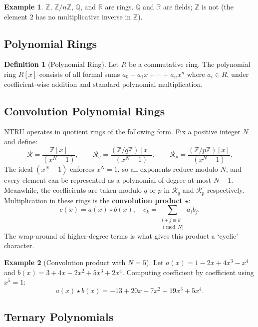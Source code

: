 \documentclass[12pt, a4paper]{article}
\theoremstyle{definition}
\newtheorem{definition}{Definition}[section]
\newtheorem{example}{Example}[section]
\theoremstyle{plain}
\newcommand{\Z}{\mathbb{Z}}
\newcommand{\R}{\mathcal{R}}
\begin{document}
\begin{example}
    $\Z$, $\Z/n\Z$, $\mathbb{Q}$, and $\mathbb{R}$ are rings. $\mathbb{Q}$ and $\mathbb{R}$ are fields; $\Z$ is not (the element $2$ has no multiplicative inverse in $\Z$).
\end{example}

\subsection{Polynomial Rings}

\begin{definition}[Polynomial Ring]
    Let $R$ be a commutative ring. The polynomial ring $R[x]$ consists of all formal sums $a_0 + a_1 x + \cdots + a_n x^n$ where $a_i \in R$, under coefficient-wise addition and standard polynomial multiplication.
\end{definition}

\subsection{Convolution Polynomial Rings}

NTRU operates in quotient rings of the following form. Fix a positive integer $N$ and define:
\[
    \R = \frac{\Z[x]}{(x^N - 1)}, \qquad
    \R_q = \frac{(\Z/q\Z)[x]}{(x^N - 1)}, \qquad
    \R_p = \frac{(\Z/p\Z)[x]}{(x^N - 1)}.
\]
The ideal $(x^N - 1)$ enforces $x^N = 1$, so all exponents reduce modulo $N$, and every element can be represented as a polynomial of degree at most $N-1$. Meanwhile, the coefficients are taken modulo $q$ or $p$ in $\R_q$ and $\R_p$ respectively.\\

Multiplication in these rings is the \textbf{convolution product} $\star$:
\[
    c(x) = a(x) \star b(x), \quad c_k = \sum_{\substack{i+j \equiv k \\ \pmod{N}}} a_i b_j.
\]
The wrap-around of higher-degree terms is what gives this product a `cyclic' character.

\begin{example}[Convolution product with $N = 5$]
    Let $a(x) = 1 - 2x + 4x^3 - x^4$ and $b(x) = 3 + 4x - 2x^2 + 5x^3 + 2x^4$.
    Computing coefficient by coefficient using $x^5 = 1$:
    \[
        a(x) \star b(x) = -13 + 20x - 7x^2 + 19x^3 + 5x^4.
    \]
\end{example}

\subsection{Ternary Polynomials}
\end{document}
